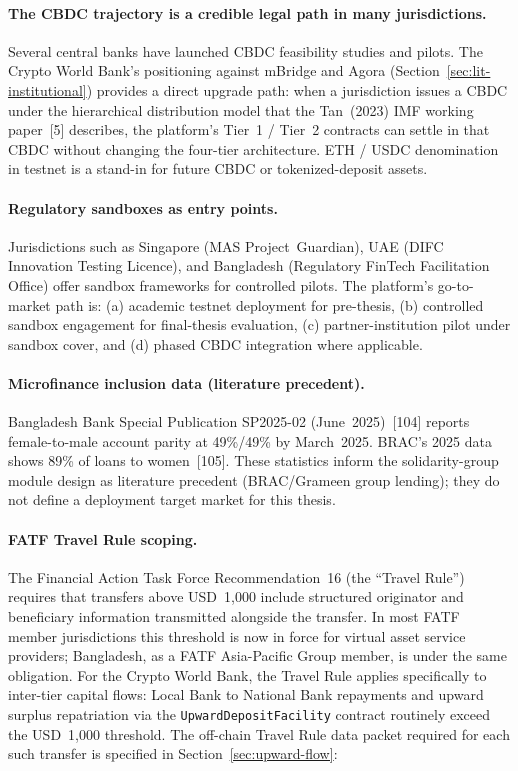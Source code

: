 \documentclass[12pt,a4paper]{report}
\begin{document}
\paragraph{The CBDC trajectory is a credible legal path in many jurisdictions.}
Several central banks have launched CBDC feasibility studies and pilots. The Crypto World Bank's positioning against mBridge and Agora (Section~\ref{sec:lit-institutional}) provides a direct upgrade path: when a jurisdiction issues a CBDC under the hierarchical distribution model that the Tan~(2023) IMF working paper~[5] describes, the platform's Tier~1 / Tier~2 contracts can settle in that CBDC without changing the four-tier architecture. ETH / USDC denomination in testnet is a stand-in for future CBDC or tokenized-deposit assets.

\paragraph{Regulatory sandboxes as entry points.}
Jurisdictions such as Singapore (MAS Project~Guardian), UAE (DIFC Innovation Testing Licence), and Bangladesh (Regulatory FinTech Facilitation Office) offer sandbox frameworks for controlled pilots. The platform's go-to-market path is: (a) academic testnet deployment for pre-thesis, (b) controlled sandbox engagement for final-thesis evaluation, (c) partner-institution pilot under sandbox cover, and (d) phased CBDC integration where applicable.

\paragraph{Microfinance inclusion data (literature precedent).}
Bangladesh Bank Special Publication SP2025-02 (June~2025)~[104] reports female-to-male account parity at 49\%/49\% by March~2025. BRAC's 2025 data shows 89\% of loans to women~[105]. These statistics inform the solidarity-group module design as literature precedent (BRAC/Grameen group lending); they do not define a deployment target market for this thesis.

\paragraph{FATF Travel Rule scoping.}
The Financial Action Task Force Recommendation~16 (the ``Travel Rule'') requires that transfers above USD~1{,}000 include structured originator and beneficiary information transmitted alongside the transfer. In most FATF member jurisdictions this threshold is now in force for virtual asset service providers; Bangladesh, as a FATF Asia-Pacific Group member, is under the same obligation. For the Crypto World Bank, the Travel Rule applies specifically to inter-tier capital flows: Local Bank to National Bank repayments and upward surplus repatriation via the \texttt{UpwardDepositFacility} contract routinely exceed the USD~1{,}000 threshold. The off-chain Travel Rule data packet required for each such transfer is specified in Section~\ref{sec:upward-flow}:
\end{document}
